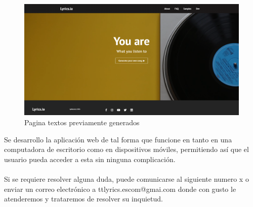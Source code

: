 \documentclass[12pt, a4paper, titlepage]{report}
\begin{document}
	\begin{figure}[H] 
		\includegraphics[width=13.5cm]{./Imagenes/Capturas/x.png}
		\centering \caption{Pagina textos previamente generados}
	\end{figure}	
	Se desarrollo la aplicación web de tal forma que funcione en tanto en una computadora de escritorio como en dispositivos móviles, permitiendo así que el usuario pueda acceder a esta sin ninguna complicación.\\\\
	Si se requiere resolver alguna duda, puede comunicarse al siguiente numero x o enviar un correo electrónico a ttlyrics.escom@gmai.com donde con gusto le atenderemos y trataremos de resolver su inquietud. 
	
	\begin{thebibliography}{20}
	\end{thebibliography}	
\end{document}
